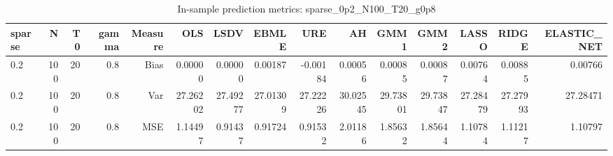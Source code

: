 \begin{table}[!htbp]\centering
\caption{In-sample prediction metrics: sparse_0p2_N100_T20_g0p8}
\label{tab:table2_sparse_0p2_N100_T20_g0p8}
\begin{tabular}{lrrrrrrrrrrrrrr}
\hline
sparse & N & T0 & gamma & Measure & OLS & LSDV & EBMLE & URE & AH & GMM1 & GMM2 & LASSO & RIDGE & ELASTIC_NET \\
\hline
0.2 & 100 & 20 & 0.8 & Bias & 0.00000 & 0.00000 & 0.00187 & -0.00184 & 0.00056 & 0.00085 & 0.00087 & 0.00764 & 0.00885 & 0.00766 \\
0.2 & 100 & 20 & 0.8 & Var & 27.26202 & 27.49277 & 27.01309 & 27.22226 & 30.02545 & 29.73801 & 29.73847 & 27.28479 & 27.27993 & 27.28471 \\
0.2 & 100 & 20 & 0.8 & MSE & 1.14497 & 0.91437 & 0.91724 & 0.91532 & 2.01186 & 1.85632 & 1.85644 & 1.10784 & 1.11217 & 1.10797 \\
\hline
\end{tabular}
\end{table}

